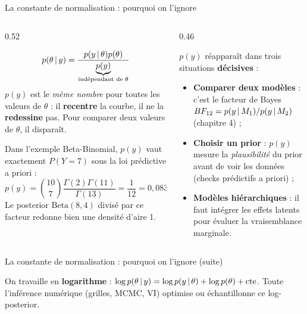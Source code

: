 \begin{frame}{La constante de normalisation : pourquoi on l'ignore}
\begin{columns}[t]
\begin{column}{0.52\textwidth}
\begin{kbox}[Le raisonnement]
\[
p(\theta \,\vert\, y) = \frac{p(y \,\vert\, \theta)p(\theta)}{\underbrace{p(y)}_{\text{indépendant de }\theta}}
\]
$p(y)$ est le \emph{même nombre} pour toutes les valeurs de $\theta$ :
il \textbf{recentre} la courbe, il ne la \textbf{redessine} pas. Pour
comparer deux valeurs de $\theta$, il disparaît.
\end{kbox}
\begin{ebox}
Dans l'exemple Beta-Binomial, $p(y)$ vaut exactement
$P(Y = 7)$ sous la loi prédictive a priori :
\[
p(y) = \binom{10}{7}\frac{\Gamma(2)\Gamma(11)}{\Gamma(13)} = \frac{1}{12} = 0{,}0833
\]
Le posterior $\mathrm{Beta}(8,4)$ divisé par ce facteur redonne bien une densité d'aire 1.
\end{ebox}
\end{column}
\begin{column}{0.46\textwidth}
\begin{wbox}
$p(y)$ réapparaît dans trois situations \textbf{décisives} :
\begin{itemize}
  \item \textbf{Comparer deux modèles} : c'est le facteur de Bayes
        $BF_{12} = p(y \,\vert\, M_1)/p(y \,\vert\, M_2)$ (chapitre 4) ;
  \item \textbf{Choisir un prior} : $p(y)$ mesure la \emph{plausibilité}
        du prior avant de voir les données (checks prédictifs a priori) ;
  \item \textbf{Modèles hiérarchiques} : il faut intégrer les effets
        latents pour évaluer la vraisemblance marginale.
\end{itemize}
\end{wbox}
\end{column}
\end{columns}
\end{frame}

\begin{frame}{La constante de normalisation : pourquoi on l'ignore (suite)}
\begin{kbox}
On travaille en \textbf{logarithme} :
$\log p(\theta \,\vert\, y) = \log p(y \,\vert\, \theta) + \log p(\theta) + \text{cte}$.
Toute l'inférence numérique (grilles, MCMC, VI) optimise ou échantillonne ce log-posterior.
\end{kbox}

\end{frame}

